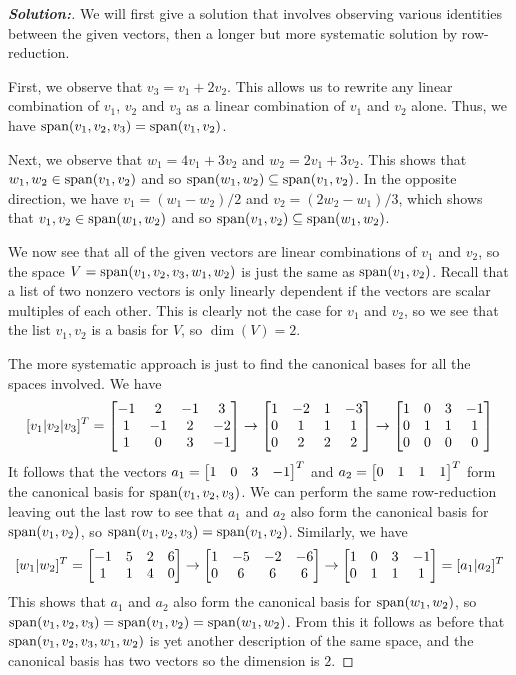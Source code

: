 \documentclass[a4paper]{amsart}
\theoremstyle{definition}
\newenvironment{solution}{\begin{proof}[\textbf{Solution:}] \vphantom{u}}{\end{proof}}
\begin{document}
\begin{solution}
 We will first give a solution that involves observing various
 identities between the given vectors, then a longer but more
 systematic solution by row-reduction.

 First, we observe that $v_3=v_1+2v_2$.  This allows us to rewrite any
 linear combination of $v_1$, $v_2$ and $v_3$ as a linear combination
 of $v_1$ and $v_2$ alone.  Thus, we have
 $\operatorname{span}(v_1,v_2,v_3)=\operatorname{span}(v_1,v_2)$.  

 Next, we observe that $w_1=4v_1+3v_2$ and $w_2=2v_1+3v_2$.  This
 shows that $w_1,w_2\in\operatorname{span}(v_1,v_2)$ and so
 $\operatorname{span}(w_1,w_2)\subseteq\operatorname{span}(v_1,v_2)$.  In the opposite direction, we have 
 $v_1=(w_1-w_2)/2$ and $v_2=(2w_2-w_1)/3$, which shows that
 $v_1,v_2\in\operatorname{span}(w_1,w_2)$ and so $\operatorname{span}(v_1,v_2)\subseteq\operatorname{span}(w_1,w_2)$.

 We now see that all of the given vectors are linear combinations of
 $v_1$ and $v_2$, so the space $V=\operatorname{span}(v_1,v_2,v_3,w_1,w_2)$ is just
 the same as $\operatorname{span}(v_1,v_2)$.  Recall that a list of two nonzero
 vectors is only linearly dependent if the vectors are scalar
 multiples of each other.  This is clearly not the case for $v_1$ and
 $v_2$, so we see that the list $v_1,v_2$ is a basis for $V$, so
 $\dim(V)=2$.  

 The more systematic approach is just to find the canonical bases for
 all the spaces involved.  We have
 \[ 
  [v_1|v_2|v_3]^T 
  = 
  \left[\begin{matrix} 
   -1 &  2 & -1 &  3 \\
    1 & -1 &  2 & -2 \\
    1 &  0 &  3 & -1 
  \end{matrix}\right]
  \to 
  \left[\begin{matrix} 
    1 & -2 &  1 & -3 \\
    0 &  1 &  1 &  1 \\
    0 &  2 &  2 &  2 
  \end{matrix}\right]
  \to
  \left[\begin{matrix} 
    1 &  0 &  3 & -1 \\
    0 &  1 &  1 &  1 \\
    0 &  0 &  0 &  0 
  \end{matrix}\right]
 \]
 It follows that the vectors $a_1=\left[\begin{matrix} 1&0&3&-1\end{matrix}\right]^T$ and
 $a_2=\left[\begin{matrix} 0&1&1&1\end{matrix}\right]^T$ form the canonical basis for
 $\operatorname{span}(v_1,v_2,v_3)$.  We can perform the same row-reduction leaving
 out the last row to see that $a_1$ and $a_2$ also form the canonical
 basis for $\operatorname{span}(v_1,v_2)$, so $\operatorname{span}(v_1,v_2,v_3)=\operatorname{span}(v_1,v_2)$.
 Similarly, we have
 \[ [w_1|w_2]^T =
     \left[\begin{matrix}
      -1 &  5 &  2 &  6 \\
       1 &  1 &  4 &  0 
     \end{matrix}\right] 
     \to
     \left[\begin{matrix}
       1 & -5 & -2 & -6 \\
       0 &  6 &  6 &  6 
     \end{matrix}\right] 
     \to
     \left[\begin{matrix}
       1 &  0 &  3 & -1 \\
       0 &  1 &  1 &  1 
     \end{matrix}\right] 
     =
     [a_1|a_2]^T
 \]
 This shows that $a_1$ and $a_2$ also form the canonical
 basis for $\operatorname{span}(w_1,w_2)$, so
 $\operatorname{span}(v_1,v_2,v_3)=\operatorname{span}(v_1,v_2)=\operatorname{span}(w_1,w_2)$.  From this it
 follows as before that $\operatorname{span}(v_1,v_2,v_3,w_1,w_2)$ is yet another
 description of the same space, and the canonical basis has two
 vectors so the dimension is $2$.
\end{solution}
\end{document}
